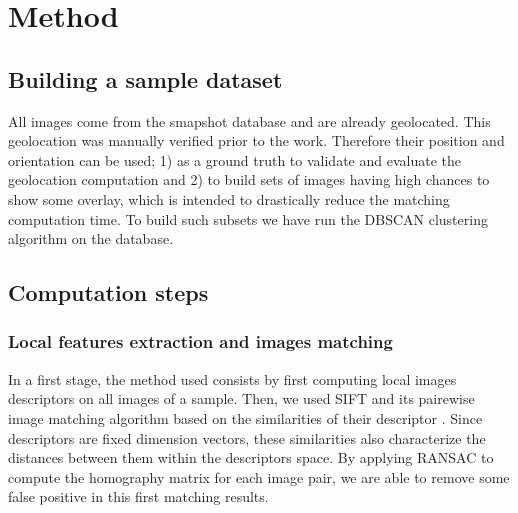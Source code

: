\documentclass[fleqn,10pt]{wlpeerj} %
\begin{document}
\section*{Method}
\subsection*{Building a sample dataset}
All images come from the smapshot database and are already geolocated. 
This geolocation was manually verified prior to the work. 
Therefore their position and orientation can be used; 
1) as a ground truth to  validate and evaluate the geolocation computation and 
2) to build sets of images having high chances to show some overlay, 
which is intended to drastically reduce the matching computation time. 
To build such subsets we have run the DBSCAN clustering algorithm 
\citep{ester1996} on the database.

\subsection*{Computation steps}


\subsubsection*{Local features extraction and images matching}
In a first stage, 
the method used consists by first computing local images descriptors on all 
images of a sample. 
Then, we used SIFT and its pairewise image matching algorithm based on the 
similarities of their descriptor \citep{lowe1999}. 
Since descriptors are fixed dimension vectors, these similarities also characterize 
the distances between them within the descriptors space. 
By applying RANSAC \citep{fischler1981} to compute the homography matrix for each 
image pair, we are able to remove some false positive in this first matching results.
 
\end{document}
